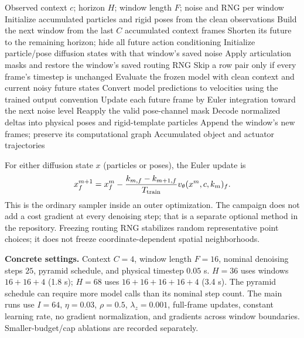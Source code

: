 \documentclass[10pt]{article}
\begin{document}
\begin{algorithm}[H]
\caption{Windowed sampler $G_\theta$ inside each objective evaluation}
\begin{algorithmic}[1]
\REQUIRE Observed context $c$; horizon $H$; window length $F$; noise and RNG per window
\STATE Initialize accumulated particles and rigid poses from the clean observations
  \STATE Build the next window from the last $C$ accumulated context frames
  \STATE Shorten its future to the remaining horizon; hide all future action conditioning
  \STATE Initialize particle/pose diffusion states with that window's saved noise
  \STATE Apply articulation masks and restore the window's saved routing RNG
    \STATE Skip a row pair only if every frame's timestep is unchanged
    \STATE Evaluate the frozen model with clean context and current noisy future states
    \STATE Convert model predictions to velocities using the trained output convention
    \STATE Update each future frame by Euler integration toward the next noise level
    \STATE Reapply the valid pose-channel mask
  \ENDFOR
  \STATE Decode normalized deltas into physical poses and rigid-template particles
  \STATE Append the window's new frames; preserve its computational graph
\ENDWHILE
\RETURN Accumulated object and actuator trajectories
\end{algorithmic}
\end{algorithm}

For either diffusion state $x$ (particles or poses), the Euler update is
\[
 x_f^{m+1}=x_f^m-\frac{k_{m,f}-k_{m+1,f}}{T_{\rm train}}
                  v_\theta(x^m,c,k_m)_f.
\]
This is the ordinary sampler inside an outer optimization. The campaign does
not add a cost gradient at every denoising step; that is a separate optional
method in the repository. Freezing routing RNG stabilizes random representative
point choices; it does not freeze coordinate-dependent spatial neighborhoods.

\textbf{Concrete settings.} Context $C=4$, window length $F=16$, nominal
denoising steps $25$, pyramid schedule, and physical timestep $0.05$ s.
$H=36$ uses windows $16+16+4$ (1.8 s); $H=68$ uses $16+16+16+16+4$ (3.4 s).
The pyramid schedule can require more model calls than its nominal step count.
The main runs use $I=64$, $\eta=0.03$, $\rho=0.5$, $\lambda_z=0.001$, full-frame
updates, constant learning rate, no gradient normalization, and gradients
across window boundaries. Smaller-budget/cap ablations are recorded separately.
\end{document}
